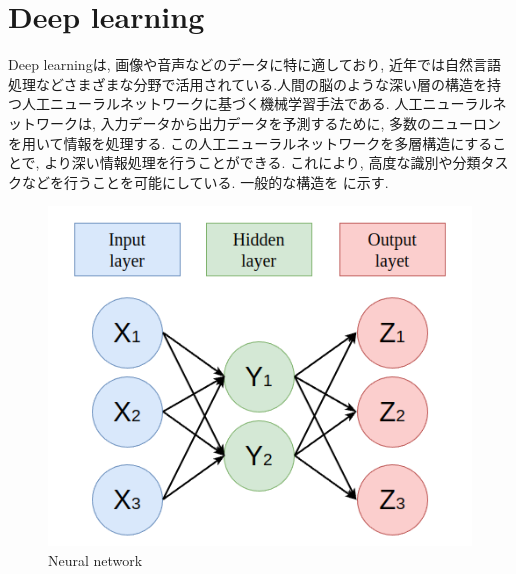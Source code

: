 
\section{Deep learning}
Deep learningは, 画像や音声などのデータに特に適しており, 近年では自然言語処理などさまざまな分野で活用されている.人間の脳のような深い層の構造を持つ人工ニューラルネットワークに基づく機械学習手法である. 人工ニューラルネットワークは, 入力データから出力データを予測するために, 多数のニューロンを用いて情報を処理する. この人工ニューラルネットワークを多層構造にすることで, より深い情報処理を行うことができる. これにより, 高度な識別や分類タスクなどを行うことを可能にしている. 一般的な構造を  に示す.


\begin{figure}[hbtp]
  \centering
 \includegraphics[keepaspectratio, scale=0.34]
      {images/neural_network.png}
 \caption{Neural network}
 \label{Fig:Neural network}
\end{figure}

\newpage
